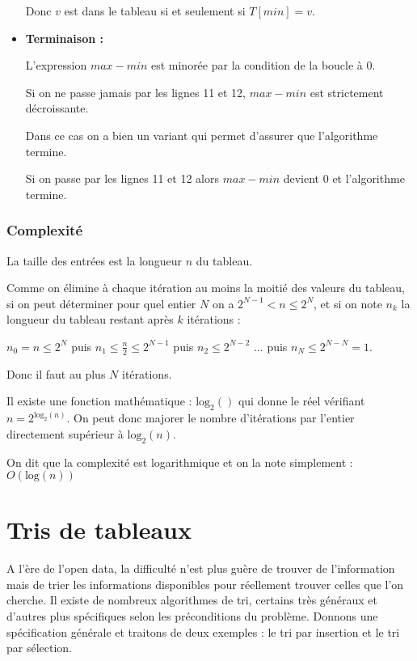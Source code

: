 \begin{itemize}
	Donc $v$ est dans le tableau si et seulement si $T[min] = v$.
	
	
	\item {\bfseries Terminaison :}
	
	L'expression $max - min$ est minorée par la condition de la boucle à 0.
	
	Si on ne passe jamais par les lignes 11 et 12, $max - min$ est strictement décroissante.
	
	Dans ce cas on a bien un variant qui permet d'assurer que l'algorithme termine.
	
	Si on passe par les lignes 11 et 12 alors $max - min$ devient 0 et l'algorithme termine.
\end{itemize}

\subsection{Complexité}

La taille des entrées est la longueur $n$ du tableau.

Comme on élimine à chaque itération au moins la moitié des valeurs du tableau, si on peut déterminer pour quel entier $N$ on a $2^{N-1} < n \leqslant 2^N$, et si on note $n_k$ la longueur du tableau restant après $k$ itérations :

$n_0 = n \leqslant 2^N$ puis $n_1 \leqslant \frac{n}{2} \leqslant 2^{N-1}$ puis $n_2 \leqslant 2^{N-2}$ ... puis $n_N \leqslant 2^{N-N} = 1$.

Donc il faut au plus $N$ itérations.

\medskip

Il existe une fonction mathématique : $\text{log}_2()$ qui donne le réel vérifiant $n = 2 ^{\text{log}_2(n)}$. On peut donc majorer le nombre d'itérations par l'entier directement supérieur à $\text{log}_2(n)$.

On dit que la complexité est logarithmique et on la note simplement : $O(\text{log}(n))$



\chapter{Tris de tableaux}

A l'ère de l'open data, la difficulté n'est plus guère de trouver de l'information mais de trier les informations disponibles pour réellement trouver celles que l'on cherche. Il existe de nombreux algorithmes de tri, certains très généraux et d'autres plus spécifiques selon les préconditions du problème. Donnons une spécification générale et traitons de deux exemples : le tri par insertion et le tri par sélection.

